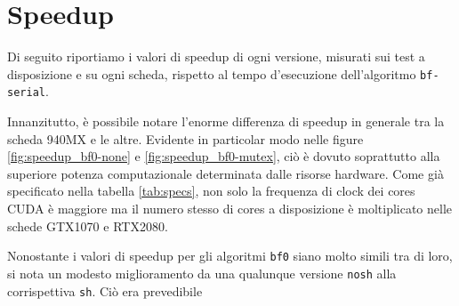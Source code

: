 \documentclass[12pt,a4paper]{book} %
\begin{document}
	\section{Speedup}
	Di seguito riportiamo i valori di speedup di ogni versione, misurati sui test a disposizione e su ogni scheda, rispetto al tempo d'esecuzione dell'algoritmo \texttt{bf-serial}.
	
	Innanzitutto, è possibile notare l'enorme differenza di speedup in generale tra la scheda 940MX e le altre. Evidente in particolar modo nelle figure \ref{fig:speedup_bf0-none} e \ref{fig:speedup_bf0-mutex}, ciò è dovuto soprattutto alla superiore potenza computazionale determinata dalle risorse hardware. Come già specificato nella tabella \ref{tab:specs}, non solo la frequenza di clock dei cores CUDA è maggiore ma il numero stesso di cores a disposizione è moltiplicato nelle schede GTX1070 e RTX2080.
	
	Nonostante i valori di speedup per gli algoritmi \texttt{bf0} siano molto simili tra di loro, si nota un modesto miglioramento da una qualunque versione \texttt{nosh} alla corrispettiva \texttt{sh}. Ciò era prevedibile 
	
\end{document}
